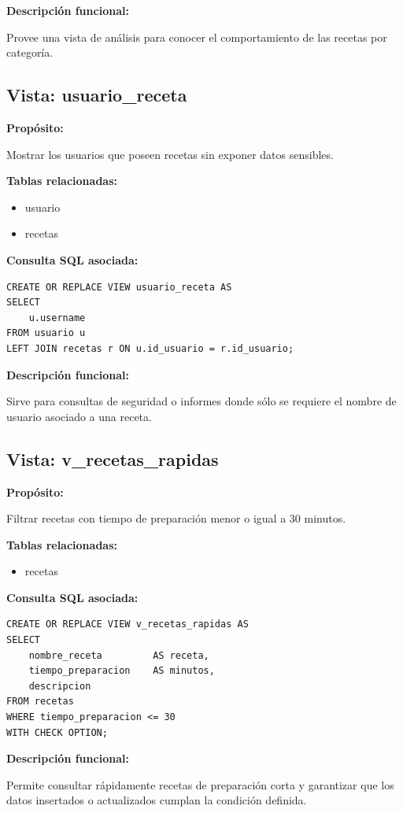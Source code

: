 \documentclass[12pt,a4paper]{article}
\begin{document}
\textbf{Descripción funcional:}

Provee una vista de análisis para conocer el comportamiento de las recetas por categoría.

\subsection{Vista: usuario\_receta}

\textbf{Propósito:}

Mostrar los usuarios que poseen recetas sin exponer datos sensibles.

\textbf{Tablas relacionadas:}
\begin{itemize}
    \item usuario
    \item recetas
\end{itemize}

\textbf{Consulta SQL asociada:}
\begin{verbatim}
CREATE OR REPLACE VIEW usuario_receta AS
SELECT
    u.username
FROM usuario u
LEFT JOIN recetas r ON u.id_usuario = r.id_usuario;
\end{verbatim}

\textbf{Descripción funcional:}

Sirve para consultas de seguridad o informes donde sólo se requiere el nombre de usuario asociado a una receta.

\subsection{Vista: v\_recetas\_rapidas}

\textbf{Propósito:}

Filtrar recetas con tiempo de preparación menor o igual a 30 minutos.

\textbf{Tablas relacionadas:}
\begin{itemize}
    \item recetas
\end{itemize}

\textbf{Consulta SQL asociada:}
\begin{verbatim}
CREATE OR REPLACE VIEW v_recetas_rapidas AS
SELECT
    nombre_receta         AS receta,
    tiempo_preparacion    AS minutos,
    descripcion
FROM recetas
WHERE tiempo_preparacion <= 30
WITH CHECK OPTION;
\end{verbatim}

\textbf{Descripción funcional:}

Permite consultar rápidamente recetas de preparación corta y garantizar que los datos insertados o actualizados cumplan la condición definida.
\end{document}
